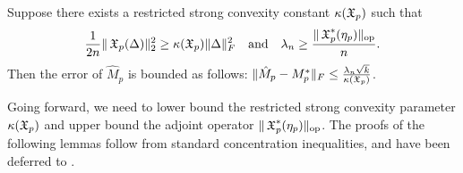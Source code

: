 


\begin{lemma}
\label{lem:lowRank}
Suppose there exists a restricted strong convexity constant $\kappa(\operatorname{\mathfrak{X}}_p)$ such that
$$\frac{1}{2n} \| \operatorname{\mathfrak{X}}_p( \Delta )\|_2^2 \ge \kappa(\operatorname{\mathfrak{X}}_p) \|\Delta\|^2_F \quad \text{and} \quad
\lambda_n \ge \frac{\|\operatorname{\mathfrak{X}}_p^*(\eta_p)\|_{\text{op}}}{n}.$$
Then the error of $\hat M_p$ is bounded as follows:
$\| \hat M_p - M_p^* \|_F \le \frac{\lambda_n \sqrt{k}}{\kappa(\operatorname{\mathfrak{X}}_p)}$.
\end{lemma}

Going forward, we need to lower bound the restricted strong convexity
parameter $\kappa(\operatorname{\mathfrak{X}}_p)$ and upper bound the adjoint operator
$\|\operatorname{\mathfrak{X}}_p^*(\eta_p)\|_{\text{op}}$. The proofs of the following lemmas follow
from standard concentration inequalities, and have been deferred to
. 


